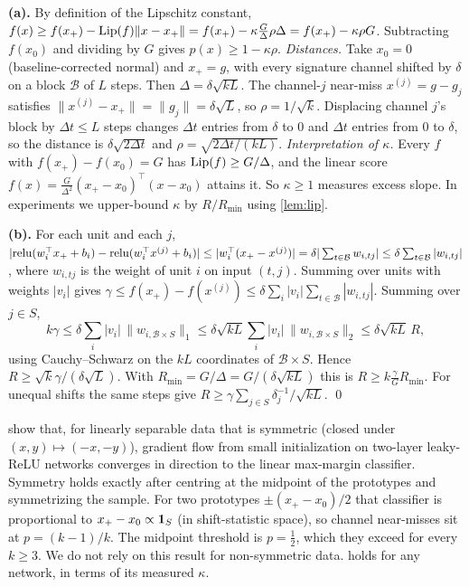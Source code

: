 \textbf{(a).} By definition of the Lipschitz constant, $f(x)\ge f(x_+)-\mathrm{Lip}(f)\|x-x_+\|=f(x_+)-\kappa\frac{G}{\Delta}\rho\Delta=f(x_+)-\kappa\rho G$. Subtracting $f(x_0)$ and dividing by $G$ gives $p(x)\ge1-\kappa\rho$. \emph{Distances.} Take $x_0=0$ (baseline-corrected normal) and $x_+=g$, with every signature channel shifted by $\delta$ on a block $\mathcal B$ of $L$ steps. Then $\Delta=\delta\sqrt{kL}$. The channel-$j$ near-miss $x^{(j)}=g-g_j$ satisfies $\|x^{(j)}-x_+\|=\|g_j\|=\delta\sqrt L$, so $\rho=1/\sqrt k$. Displacing channel $j$'s block by $\Delta t\le L$ steps changes $\Delta t$ entries from $\delta$ to $0$ and $\Delta t$ entries from $0$ to $\delta$, so the distance is $\delta\sqrt{2\Delta t}$ and $\rho=\sqrt{2\Delta t/(kL)}$. \emph{Interpretation of $\kappa$.} Every $f$ with $f(x_+)-f(x_0)=G$ has $\mathrm{Lip}(f)\ge G/\Delta$, and the linear score $f(x)=\frac{G}{\Delta^2}(x_+-x_0)^\top(x-x_0)$ attains it. So $\kappa\ge1$ measures excess slope. In experiments we upper-bound $\kappa$ by $R/R_{\min}$ using \cref{lem:lip}.

\textbf{(b).} For each unit and each $j$,
$|\mathrm{relu}(w_i^\top x_++b_i)-\mathrm{relu}(w_i^\top x^{(j)}+b_i)|\le|w_i^\top(x_+-x^{(j)})|=\delta|\sum_{t\in\mathcal B}w_{i,tj}|\le\delta\sum_{t\in\mathcal B}|w_{i,tj}|$, where $w_{i,tj}$ is the weight of unit $i$ on input $(t,j)$. Summing over units with weights $|v_i|$ gives $\gamma\le f(x_+)-f(x^{(j)})\le\delta\sum_i|v_i|\sum_{t\in\mathcal B}|w_{i,tj}|$. Summing over $j\in S$,
\[
k\gamma\le\delta\sum_i|v_i|\,\|w_{i,\mathcal B\times S}\|_1\le\delta\sqrt{kL}\sum_i|v_i|\,\|w_{i,\mathcal B\times S}\|_2\le\delta\sqrt{kL}\,R ,
\]
using Cauchy--Schwarz on the $kL$ coordinates of $\mathcal B\times S$. Hence $R\ge\sqrt k\gamma/(\delta\sqrt L)$. With $R_{\min}=G/\Delta=G/(\delta\sqrt{kL})$ this is $R\ge k\frac{\gamma}{G}R_{\min}$. For unequal shifts the same steps give $R\ge\gamma\sum_{j\in S}\delta_j^{-1}/\sqrt{kL}$. \qed

\begin{remark}\label{rem:lyu}
\citet{lyu2021} show that, for linearly separable data that is symmetric (closed under $(x,y)\mapsto(-x,-y)$), gradient flow from small initialization on two-layer leaky-ReLU networks converges in direction to the linear max-margin classifier. Symmetry holds exactly after centring at the midpoint of the prototypes and symmetrizing the sample. For two prototypes $\pm(x_+-x_0)/2$ that classifier is proportional to $x_+-x_0\propto\mathbf{1}_S$ (in shift-statistic space), so channel near-misses sit at $p=(k-1)/k$. The midpoint threshold is $p=\frac12$, which they exceed for every $k\ge3$. We do not rely on this result for non-symmetric data.  holds for any network, in terms of its measured $\kappa$.
\end{remark}

